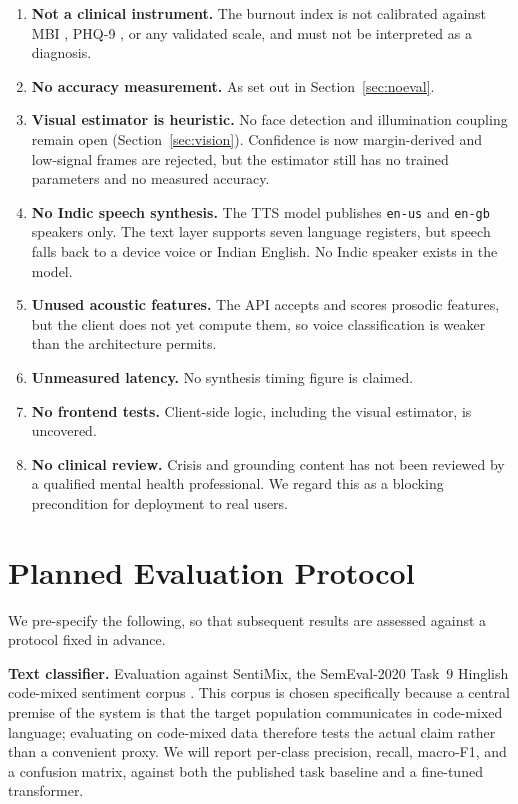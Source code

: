 \documentclass[conference]{IEEEtran}
\begin{document}
\begin{enumerate}
\item \textbf{Not a clinical instrument.} The burnout index is not calibrated
against MBI \cite{maslach}, PHQ-9 \cite{phq9}, or any validated scale, and must
not be interpreted as a diagnosis.
\item \textbf{No accuracy measurement.} As set out in
Section~\ref{sec:noeval}.
\item \textbf{Visual estimator is heuristic.} No face detection and
illumination coupling remain open (Section~\ref{sec:vision}). Confidence is
now margin-derived and low-signal frames are rejected, but the estimator still
has no trained parameters and no measured accuracy.
\item \textbf{No Indic speech synthesis.} The TTS model publishes
\texttt{en-us} and \texttt{en-gb} speakers only. The text layer supports seven
language registers, but speech falls back to a device voice or Indian English.
No Indic speaker exists in the model.
\item \textbf{Unused acoustic features.} The API accepts and scores prosodic
features, but the client does not yet compute them, so voice classification is
weaker than the architecture permits.
\item \textbf{Unmeasured latency.} No synthesis timing figure is claimed.
\item \textbf{No frontend tests.} Client-side logic, including the visual
estimator, is uncovered.
\item \textbf{No clinical review.} Crisis and grounding content has not been
reviewed by a qualified mental health professional. We regard this as a
blocking precondition for deployment to real users.
\end{enumerate}

\section{Planned Evaluation Protocol}
\label{sec:protocol}

We pre-specify the following, so that subsequent results are assessed against
a protocol fixed in advance.

\textbf{Text classifier.} Evaluation against SentiMix, the SemEval-2020 Task~9
Hinglish code-mixed sentiment corpus \cite{sentimix}. This corpus is chosen
specifically because a central premise of the system is that the target
population communicates in code-mixed language; evaluating on code-mixed data
therefore tests the actual claim rather than a convenient proxy. We will report
per-class precision, recall, macro-F1, and a confusion matrix, against both the
published task baseline and a fine-tuned transformer.
\end{document}
